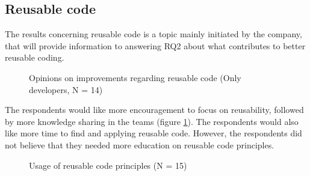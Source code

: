 \subsection{Reusable code}
The results concerning reusable code is a topic mainly initiated by the company, that will provide information to answering RQ2 about what contributes to better reusable coding.

\begin{figure}%
\centering
{}
\caption{Opinions on improvements regarding reusable code (Only developers, N = 14)}
\label{fig:opinion_of_improvement_to_reusable_code}
\end{figure}

The respondents would like more encouragement to focus on reusability, followed by more knowledge sharing in the teams (figure \ref{fig:opinion_of_improvement_to_reusable_code}). The respondents would also like more time to find and applying reusable code. However, the respondents did not believe that they needed more education on reusable code principles.  

\begin{figure}%
\centering
{}
\caption{Usage of reusable code principles (N = 15)}
\label{fig:usage_of_reusable_code_principles}
\end{figure}


